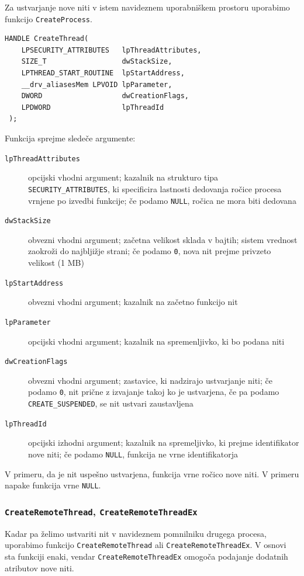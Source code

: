 \documentclass[a4paper,12pt,openright]{book}
\begin{document}
Za ustvarjanje nove niti v istem navideznem uporabniškem prostoru uporabimo funkcijo \texttt{CreateProcess}.

\begin{lstlisting}[style=func]
 HANDLE CreateThread(
	LPSECURITY_ATTRIBUTES   lpThreadAttributes,
	SIZE_T                  dwStackSize,
	LPTHREAD_START_ROUTINE  lpStartAddress,
	__drv_aliasesMem LPVOID lpParameter,
	DWORD                   dwCreationFlags,
	LPDWORD                 lpThreadId
 );
\end{lstlisting}

Funkcija sprejme sledeče argumente:
\begin{description}
	\item[\texttt{lpThreadAttributes}] opcijski vhodni argument; kazalnik na strukturo tipa \texttt{SECURITY\_ATTRIBUTES}, ki specificira lastnosti dedovanja ročice procesa vrnjene po izvedbi funkcije; če podamo \texttt{NULL}, ročica ne mora biti dedovana
	\item[\texttt{dwStackSize}] obvezni vhodni argument; začetna velikost sklada v bajtih; sistem vrednost zaokroži do najbljižje strani; če podamo \texttt{0}, nova nit prejme privzeto velikost (1 MB)
	\item[\texttt{lpStartAddress}] obvezni vhodni argument; kazalnik na začetno funkcijo nit
	\item[\texttt{lpParameter}] opcijski vhodni argument; kazalnik na spremenljivko, ki bo podana niti
	\item[\texttt{dwCreationFlags}] obvezni vhodni argument; zastavice, ki nadzirajo ustvarjanje niti; če podamo \texttt{0}, nit prične z izvajanje takoj ko je ustvarjena, če pa podamo \texttt{CREATE\_SUSPENDED}, se nit ustvari zaustavljena
	\item[\texttt{lpThreadId}] opcijski izhodni argument; kazalnik na spremeljivko, ki prejme identifikator nove niti; če podamo \texttt{NULL}, funkcija ne vrne identifikatorja
\end{description}

V primeru, da je nit uspešno ustvarjena, funkcija vrne ročico nove niti.
V primeru napake funkcija vrne \texttt{NULL}.

\subsubsection{\texttt{CreateRemoteThread}, \texttt{CreateRemoteThreadEx}}

Kadar pa želimo ustvariti nit v navideznem pomnilniku drugega procesa, uporabimo funkcijo \texttt{CreateRemoteThread} ali \texttt{CreateRemoteThreadEx}.
V osnovi sta funkciji enaki, vendar \texttt{CreateRemoteThreadEx} omogoča podajanje dodatnih atributov nove niti.
\end{document}
